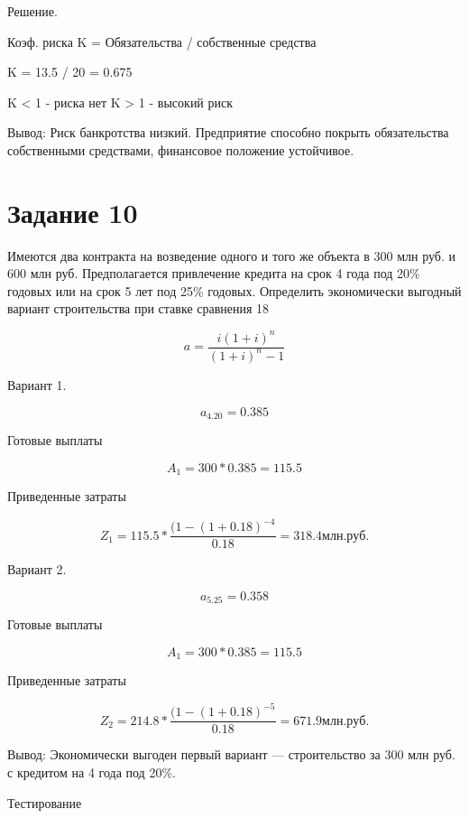 \documentclass[14pt,a4paper]{extarticle}
\begin{document}
Решение.

Коэф. риска K = Обязательства / собственные средства

K = 13.5 / 20 = 0.675

K < 1 - риска нет
K > 1 - высокий риск

Вывод: Риск банкротства низкий. Предприятие способно покрыть обязательства собственными средствами, финансовое положение устойчивое.


\section{Задание 10}
\begin{sloppypar}
Имеются два контракта на возведение одного и того же объекта в 300 млн руб. и
600 млн руб. Предполагается привлечение кредита на срок 4 года под 20\% годовых или
на срок 5 лет под 25\% годовых. Определить экономически выгодный вариант
строительства при ставке сравнения 18 %
\end{sloppypar}

\[
    a = \frac{i(1 + i)^n}{(1 + i)^n - 1}
\]

Вариант 1.

\[
    a_{4.20} = 0.385
\]

Готовые выплаты

\[
    A_1 = 300 * 0.385 = 115.5
\]

Приведенные затраты

\[
    Z_1 = 115.5 * \frac{ (1 - (1 + 0.18)^{-4} }{0.18} = 318.4 млн. руб.
\]


Вариант 2.


\[
    a_{5.25} = 0.358
\]

Готовые выплаты

\[
    A_1 = 300 * 0.385 = 115.5
\]

Приведенные затраты

\[
    Z_2 = 214.8 * \frac{ (1 - (1 + 0.18)^{-5} }{0.18} = 671.9 млн. руб.
\]

Вывод: Экономически выгоден первый вариант — строительство за 300 млн руб. с кредитом на 4 года под 20\%.

\newpage
Тестирование
\end{document}
